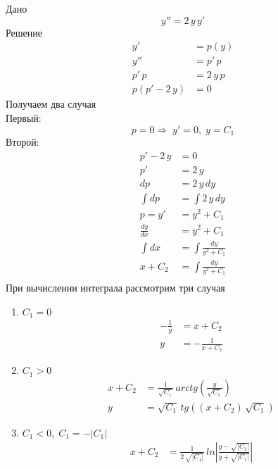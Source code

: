 \begin{Example}
    Дано
    \[
        y'' = 2\,y\,y'
    \]
    Решение
    \begin{align*}
        y' &= p(y)\\
        y'' &= p'\,p\\
        p'\,p &= 2\,y\,p\\
        p(p' - 2\,y) &= 0
    \end{align*}
    Получаем два случая\\
    Первый:
    \[
        p = 0 \Rightarrow \; y' = 0, \; y = C_1 
    \]
    Второй:
    \begin{align*}
        p'- 2\,y &= 0\\
        p' &= 2\,y\\
        dp &= 2\,y\,dy\\
        \int dp &= \int 2\,y\,dy\\
        p = y' &= y^2 + C_1\\
        \frac{dy}{dx} &= y^2 + C_1\\
        \int dx  &= \int \frac{dy}{y^2 + C_1}\\
        x + C_2 &= \int \frac{dy}{y^2 + C_1}\\
    \end{align*}
    При вычислении интеграла рассмотрим три случая
    \begin{enumerate}
    \item $C_1 = 0$  
    \begin{align*}
        -\frac{1}{y} &= x + C_2\\
        y &= -\frac{1}{x + C_2}
    \end{align*} 
                  
     \item $C_1 > 0$
     \begin{align*}
        x + C_2 &= \frac{1}{\sqrt{C_1}}\, arctg\left(\frac{y}{\sqrt{C_1}}\right)\\
        y &= \sqrt{C_1} \, tg((x + C_2)\, \sqrt{C_1})
     \end{align*}   
                
     \item $C_1 < 0, \; C_1 = -|C_1|$
     \begin{align*} 
        x + C_2 &= \frac{1}{2\,\sqrt{|C_1|}}\, ln\left|\frac{y-\sqrt{|C_1|}}{y+\sqrt{|C_1|}}\right|
     \end{align*}
    \end{enumerate}
\end{Example}